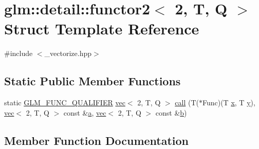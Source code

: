 \hypertarget{structglm_1_1detail_1_1functor2_3_012_00_01_t_00_01_q_01_4}{}\section{glm\+:\+:detail\+:\+:functor2$<$ 2, T, Q $>$ Struct Template Reference}
\label{structglm_1_1detail_1_1functor2_3_012_00_01_t_00_01_q_01_4}


{\ttfamily \#include $<$\+\_\+vectorize.\+hpp$>$}

\subsection*{Static Public Member Functions}
\begin{DoxyCompactItemize}
\item 
static \hyperlink{setup_8hpp_a33fdea6f91c5f834105f7415e2a64407}{G\+L\+M\+\_\+\+F\+U\+N\+C\+\_\+\+Q\+U\+A\+L\+I\+F\+I\+ER} \hyperlink{structglm_1_1vec}{vec}$<$ 2, T, Q $>$ \hyperlink{structglm_1_1detail_1_1functor2_3_012_00_01_t_00_01_q_01_4_a861cd8867e8703fae7ff738403a9b50d}{call} (T($\ast$Func)(T \hyperlink{_s_d_l__opengl_8h_ad0e63d0edcdbd3d79554076bf309fd47}{x}, T \hyperlink{_s_d_l__opengl_8h_a1675d9d7bb68e1657ff028643b4037e3}{y}), \hyperlink{structglm_1_1vec}{vec}$<$ 2, T, Q $>$ const \&\hyperlink{_s_d_l__opengl__glext_8h_a3309789fc188587d666cda5ece79cf82}{a}, \hyperlink{structglm_1_1vec}{vec}$<$ 2, T, Q $>$ const \&\hyperlink{_s_d_l__opengl__glext_8h_a0f71581a41fd2264c8944126dabbd010}{b})
\end{DoxyCompactItemize}


\subsection{Member Function Documentation}
\mbox{\label{structglm_1_1detail_1_1functor2_3_012_00_01_t_00_01_q_01_4_a861cd8867e8703fae7ff738403a9b50d}} 

